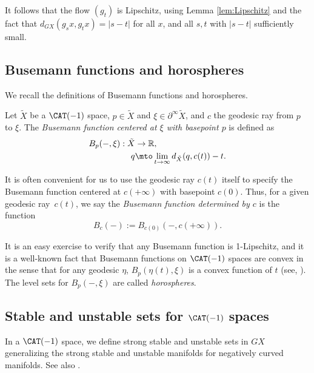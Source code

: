 It follows that the flow $(g_t)$ is Lipschitz, using Lemma \ref{lem:Lipschitz} and the fact that $d_{GX}(g_sx, g_tx) = |s-t|$ for all $x$, and all $s, t$ with $|s-t|$ sufficiently small.

\subsection{Busemann functions and horospheres}

We recall the definitions of Busemann functions and horospheres.

\begin{defn}
Let $\tilde X$ be a $\CAT(-1)$ space, $p\in \tilde X$ and $\xi\in \partial^\infty\tilde X$, and $c$ the geodesic ray from $p$ to $\xi$. The \emph{Busemann function centered at $\xi$ with basepoint $p$} is defined as
\begin{align*}
B_p(-,\xi): \tilde X &\to \mathbb{R},\\
q &\mto \lim_{t\to\infty} d_{\tilde X}(q,c(t))-t.
\end{align*}
\end{defn}

It is often convenient for us to use the geodesic ray $c(t)$ itself to specify the Busemann function centered at $c(+\infty)$ with basepoint $c(0)$. Thus, for a given geodesic ray~$c(t)$, we say the \emph{Busemann function determined by $c$} is the function
\[
B_c(-):= B_{c(0)} (-, c(+\infty)).
\]

It is an easy exercise to verify that any Busemann function is 1-Lipschitz, and it is a well-known fact that Busemann functions on $\CAT(-1)$ spaces are convex in the sense that for any geodesic $\eta$, $B_p(\eta(t),\xi)$ is a convex function of $t$ (see, \eg \cite[Prop.\,II.8.22]{bh}). The level sets for $B_p(-,\xi)$ are called \emph{horospheres}.

\subsection{Stable and unstable sets for $\CAT(-1)$ spaces}

In a $\CAT(-1)$ space, we define strong stable and unstable sets in $G X$ generalizing the strong stable and unstable manifolds for negatively curved manifolds. See also \cite[\S2.8]{mB95}.

